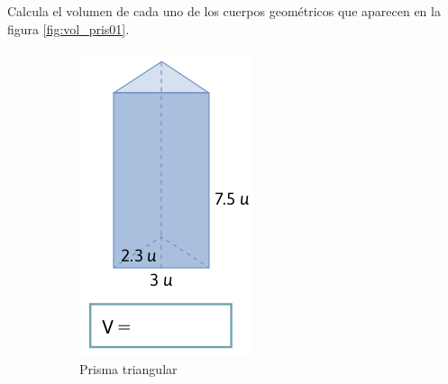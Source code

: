 \question Calcula el volumen de cada uno de los cuerpos geométricos que aparecen en la figura \ref{fig:vol_pris01}.

\begin{figure}[H]
    \centering
    \begin{subfigure}{.2\textwidth}
        \includegraphics[width=\linewidth]{../images/20230319051022}
        \caption{Prisma triangular}
        \label{sfig:20230319051022}
    \end{subfigure}
    \begin{subfigure}{.25\textwidth}

\end{subfigure}
\end{figure}
